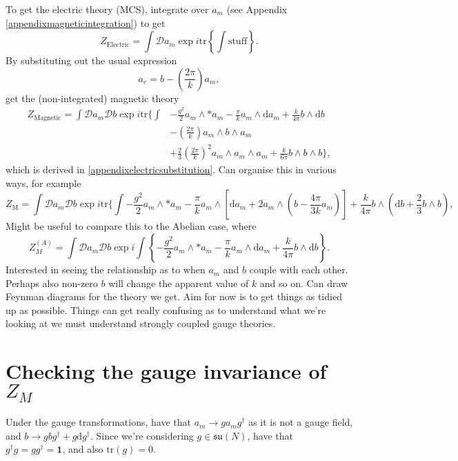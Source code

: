 \documentclass{article}
\begin{document}
To get the electric theory (MCS), integrate over $a_{m}$ (see Appendix \ref{appendixmagneticintegration}) to get
\begin{equation}
    Z_{\text{Electric}} = \int \mathcal{D}a_{m}\exp i \text{tr}\left\{\int \text{stuff}\right\}.
\end{equation}
By substituting out the usual expression
\begin{equation}
    a_{e} = b - \left(\frac{2\pi}{k} \right)a_{m}, 
\end{equation}
get the (non-integrated) magnetic theory
\begin{align}
    \label{Eq: Expanded magnetic}
    Z_{\text{Magnetic}} = \int \mathcal{D}a_{m}\mathcal{D}b \exp i \text{tr}\bigg\{\int &-\frac{g^{2}}{2}a_{m}\wedge *a_{m} - \frac{\pi}{k}a_{m}\wedge \mathrm{d}a_{m} + \frac{k}{4\pi}b\wedge \mathrm{d}b \nonumber\\
    &- \left(\frac{2\pi}{k}\right)a_{m}\wedge b \wedge a_{m}\nonumber\\
    &+ \frac{2}{3}\left(\frac{2\pi}{k}\right)^{2}a_{m}\wedge a_{m}\wedge a_{m}+ \frac{k}{6\pi}b\wedge b \wedge b\bigg\},
\end{align}
which is derived in \ref{appendixelectricsubstitution}. Can organise this in various ways, for example
\begin{equation}
    \boxed{
    Z_{\text{M}} = \int \mathcal{D}a_{m}\mathcal{D}b\exp i \text{tr}\bigg\{\int -\frac{g^{2}}{2}a_{m}\wedge *a_{m} - \frac{\pi}{k}a_{m}\wedge \left[\mathrm{d}a_{m}+2a_{m}\wedge \left(b - \frac{4\pi}{3k}a_{m}\right)\right] + \frac{k}{4\pi}b\wedge \left(\mathrm{d}b + \frac{2}{3}b\wedge b\right),
    }
\end{equation}
Might be useful to compare this to the Abelian case, where
\begin{equation}
    Z_{M}^{(A)} = \int \mathcal{D}a_{m}\mathcal{D}b \exp i \int \left\{-\frac{g^{2}}{2}a_{m}\wedge *a_{m} - \frac{\pi}{k}a_{m}\wedge \mathrm{d}a_{m} + \frac{k}{4\pi}b\wedge \mathrm{d}b\right\}.
\end{equation}
Interested in seeing the relationship as to when $a_{m}$ and $b$ couple with each other. Perhaps also non-zero $b$ will change the apparent value of $k$ and so on. Can draw Feynman diagrams for the theory we get. Aim for now is to get things as tidied up as possible. Things can get really confusing as to understand what we're looking at we must understand strongly coupled gauge theories. 



\section{Checking the gauge invariance of $Z_{M}$}
Under the gauge transformations, have that $a_{m}\rightarrow g a_{m} g^{\dagger}$ as it is not a gauge field, and $b\rightarrow gbg^{\dagger} + g\mathrm{d}g^{\dagger}$. Since we're considering $g\in \mathfrak{su}(N)$, have that $g^{\dagger} g = g g^{\dagger} = \mathbf{1}$, and also $\text{tr}\left(g\right)=0$.\newline
\end{document}

